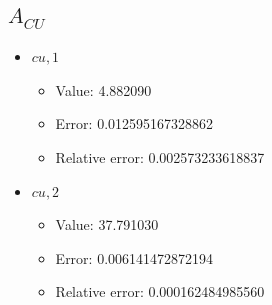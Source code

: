 \documentclass{article}%
\begin{document}
\subsection{$A_{CU}$}%
\begin{itemize}%
	\item $\textit{cu},1$%
	\begin{itemize}%
		\item Value: 4.882090%
		\item Error: 0.012595167328862%
		\item Relative error: 0.002573233618837%
	\end{itemize}%
	\item $\textit{cu},2$%
	\begin{itemize}%
		\item Value: 37.791030%
		\item Error: 0.006141472872194%
		\item Relative error: 0.000162484985560%
	\end{itemize}%
\end{itemize}%
\end{document}
